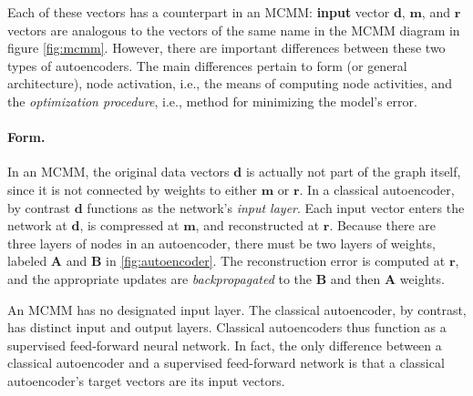 Each of these vectors has a counterpart in an MCMM: \textbf{input} vector $\textbf{d}$, $\textbf{m}$, and $\textbf{r}$ vectors are analogous to the vectors of the same name in the MCMM diagram in figure \ref{fig:mcmm}.
However, there are important differences between these two types of autoencoders. The main differences pertain to form (or general architecture), node activation, i.e., the means of computing node activities, and the \emph{optimization procedure}, i.e., method for  minimizing the model's error.

\paragraph{Form.} 
In an MCMM, 
the original data vectors $\textbf{d}$ is actually not part of the graph itself, since it is not connected by weights to either  $\textbf{m}$ or  $\textbf{r}$. In a classical autoencoder, by contrast
$\textbf{d}$ functions as the network's 
\textit{input layer}. Each input vector enters the network at $\textbf{d}$, is compressed 
at $\textbf{m}$, and reconstructed at $\textbf{r}$. Because there are three layers 
of nodes in an autoencoder, there must be two layers of weights, labeled 
$\textbf{A}$ and $\textbf{B}$ 
in \ref{fig:autoencoder}. The reconstruction error is computed at $\textbf{r}$, and the appropriate updates are 
\emph{backpropagated} to the $\textbf{B}$ and then $\textbf{A}$ weights.

An MCMM has no designated input layer. The classical autoencoder, by contrast, has distinct input and output layers. Classical autoencoders thus function as a supervised feed-forward neural network. In fact, the only difference between a classical autoencoder and a supervised feed-forward network is that a classical autoencoder's target vectors are its input vectors.

